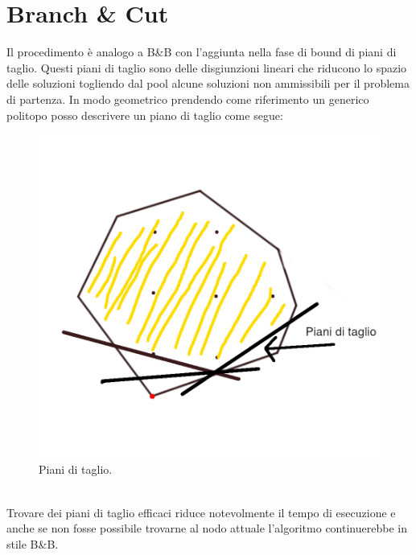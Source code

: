\documentclass[12pt,a4paper,twoside,openright]{book}
\begin{document}
\section{Branch \& Cut}
Il procedimento è analogo a B\&B con l’aggiunta nella fase di bound di piani di taglio. Questi
piani di taglio sono delle disgiunzioni lineari che riducono lo spazio delle soluzioni
togliendo dal pool alcune soluzioni non ammissibili per il problema di partenza. In modo
geometrico prendendo come riferimento un generico politopo posso descrivere un piano di
taglio come segue:\\
\begin{figure}[ht]
    \centering
    \includegraphics [scale = 0.7]{cutting_planes.png}
    \caption{Piani di taglio. }
    \label{fig:cuts}
\end{figure}\\
Trovare dei piani di taglio efficaci riduce notevolmente il tempo di esecuzione e anche se non fosse 
possibile trovarne al nodo attuale l'algoritmo continuerebbe in stile B\&B.
\end{document}
